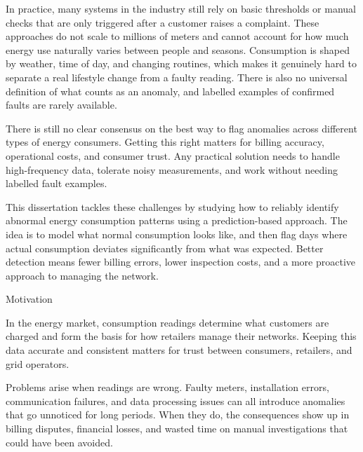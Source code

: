 ﻿\documentclass[12pt,reqno, twoside]{amsbook}
\makeatletter
\numberwithin{figure}{chapter}
\numberwithin{table}{chapter}
\numberwithin{equation}{chapter}
\def\section{\@startsection{section}{1}%
      \z@{.5\linespacing\@plus.7\linespacing}{.25\linespacing}%
      {\normalfont\bfseries\flushleft}}
\theoremstyle{plain}
\numberwithin{equation}{chapter}
\numberwithin{section}{chapter}
\makeatother
\begin{document}
In practice, many systems in the industry still rely on basic thresholds or manual checks that are only triggered after a customer raises a complaint. These approaches do not scale to millions of meters and cannot account for how much energy use naturally varies between people and seasons\cite{gaur_performance_2019}. Consumption is shaped by weather, time of day, and changing routines, which makes it genuinely hard to separate a real lifestyle change from a faulty reading. There is also no universal definition of what counts as an anomaly, and labelled examples of confirmed faults are rarely available.

There is still no clear consensus on the best way to flag anomalies across different types of energy consumers. Getting this right matters for billing accuracy, operational costs, and consumer trust. Any practical solution needs to handle high-frequency data\cite{mao_research_2024}, tolerate noisy measurements, and work without needing labelled fault examples\cite{m_z_h_unsupervised_2021}.

This dissertation tackles these challenges by studying how to reliably identify abnormal energy consumption patterns using a prediction-based approach. The idea is to model what normal consumption looks like, and then flag days where actual consumption deviates significantly from what was expected. Better detection means fewer billing errors, lower inspection costs, and a more proactive approach to managing the network.

\par

\section{Motivation}
\label{section:motivation}

\noindent In the energy market, consumption readings determine what customers are charged and form the basis for how retailers manage their networks. Keeping this data accurate and consistent matters for trust between consumers, retailers, and grid operators\cite{jan_global_2025, gaur_performance_2019}.

Problems arise when readings are wrong. Faulty meters, installation errors, communication failures, and data processing issues can all introduce anomalies that go unnoticed for long periods. When they do, the consequences show up in billing disputes, financial losses, and wasted time on manual investigations that could have been avoided\cite{gaur_performance_2019}.
\end{document}
